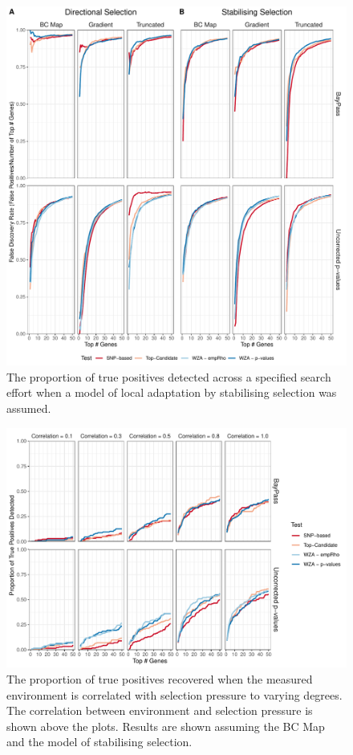 \documentclass[11pt,twoside,lineno]{GSA_format}
\begin{document}
\begin{figure}[H]
  \includegraphics[width=\linewidth]{Plots/UncorrectedBayPassComparison_FalsePositives.pdf} 
  \caption{The proportion of true positives detected across a specified search effort when a model of local adaptation  by stabilising selection was assumed.}

  \label{fig:falseDiscovery}
\end{figure}


\begin{figure}[H]
  \includegraphics[width=\linewidth]{Plots/correlatedEnvironments_BCmapResults.pdf} 
  \caption{The proportion of true positives recovered when the measured environment is correlated with selection pressure to varying degrees. The correlation between environment and selection pressure is shown above the plots. Results are shown assuming the BC Map and the model of stabilising selection.}

  \label{fig:truePosStabilising}
\end{figure}
\end{document}
